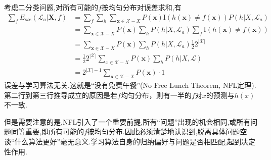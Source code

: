 考虑二分类问题,对所有可能的$f$按均匀分布对误差求和,有
\begin{equation}\begin{split}
\sum_fE_{ote}(\mathcal L_a|\mathbf X,f)&=\sum_f\sum_h\sum_{\mathbf x\in\mathcal X-X}P(\mathbf x)\text{I}(h(\mathbf x)\ne f(\mathbf x))P(h|X,\mathcal L_a)\\
&=\sum_{\mathbf x\in\mathcal X-X}P(\mathbf x)\sum_hP(h|X,\mathcal L_a)\sum_f\text{I}(h(\mathbf x)\ne f(\mathbf x))\\
&=\sum_{\mathbf x\in\mathcal X-X}P(\mathbf x)\sum_hP(h|X,\mathcal L_a)\frac{1}{2}2^{|\mathcal X|}\\
&=\frac{1}{2}2^{|\mathcal X|}\sum_{x\in\mathcal X-X}P(\mathbf x)\sum_hP(h|X,\mathcal L)\\
&=2^{|\mathcal X|-1}\sum_{\mathbf x\in\mathcal X-X}P(\mathbf x)\cdot 1
\end{split}\end{equation}
误差与学习算法无关,这就是``没有免费午餐''(No Free Lunch Theorem, NFL定理).第二行到第三行推导成立的原因是若$f$均匀分布，则有一半的$f$对$x$的预测与$h(x)$不一致.

但是需要注意的是,NFL引入了一个重要前提,所有``问题''出现的机会相同,或所有问题同等重要,即所有可能的$f$按均匀分布.因此必须清楚地认识到,脱离具体问题空谈``什么算法更好''毫无意义.学习算法自身的归纳偏好与问题是否相匹配,起到决定性作用.